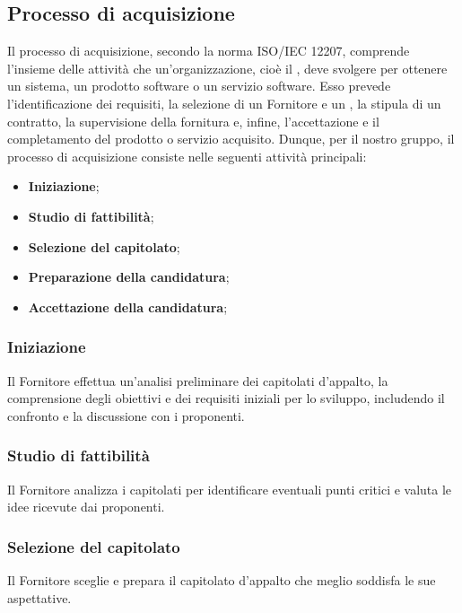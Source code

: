 \subsection{Processo di acquisizione}
\label{subsection:Processo_acquisizione}
Il processo di acquisizione, secondo la norma ISO/IEC 12207, comprende l'insieme delle attività che un'organizzazione, cioè il , deve svolgere per ottenere un sistema, un prodotto software o un servizio software. Esso prevede l'identificazione dei requisiti, la selezione di un Fornitore e un , la stipula di un contratto, la supervisione della fornitura e, infine, l'accettazione e il completamento del prodotto o servizio acquisito.
Dunque, per il nostro gruppo, il processo di acquisizione consiste nelle seguenti attività principali:

\begin{itemize}
    \item \textbf{Iniziazione}; 
    \item \textbf{Studio di fattibilità}; 
    \item \textbf{Selezione del capitolato}; 
    \item \textbf{Preparazione della candidatura}; 
    \item \textbf{Accettazione della candidatura}; 
\end{itemize}

\subsubsection{Iniziazione}
Il Fornitore effettua un'analisi preliminare dei capitolati d’appalto, la comprensione degli obiettivi e dei requisiti iniziali per lo sviluppo, includendo il confronto e la discussione con i proponenti.

\subsubsection{Studio di fattibilità}
Il Fornitore analizza i capitolati per identificare eventuali punti critici e valuta le idee ricevute dai proponenti.

\subsubsection{Selezione del capitolato}
Il Fornitore sceglie e prepara il capitolato d'appalto che meglio soddisfa le sue aspettative.

